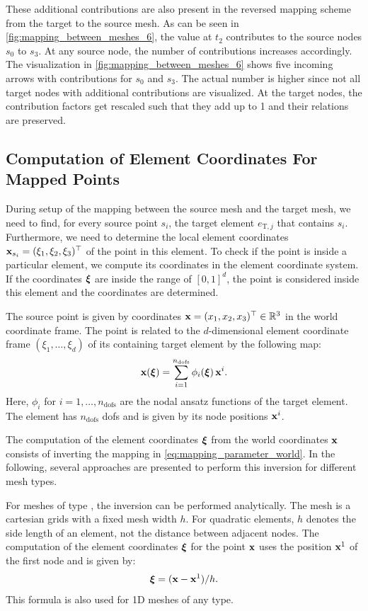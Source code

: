 These additional contributions are also present in the reversed mapping scheme from the target to the source mesh. As can be seen in \cref{fig:mapping_between_meshes_6}, the value at $t_2$ contributes to the source nodes $s_0$ to $s_3$. At any source node, the number of contributions increases accordingly. The visualization in \cref{fig:mapping_between_meshes_6} shows five incoming arrows with contributions for $s_0$ and $s_3$. The actual number is higher since not all target nodes with additional contributions are visualized. At the target nodes, the contribution factors get rescaled such that they add up to 1 and their relations are preserved.

\subsection{Computation of Element Coordinates For Mapped Points}

During setup of the mapping between the source mesh and the target mesh, we need to find, for every source point $s_i$, the target element $e_{\text{T},j}$ that contains $s_i$. Furthermore, we need to determine the local element coordinates $\textbf{x}_{s_i} = (\xi_1,\xi_2,\xi_3)^\top$ of the point in this element. To check if the point is inside a particular element, we compute its coordinates in the element coordinate system. If the coordinates $\boldsymbol{\xi}$ are inside the range of $[0,1]^d$, the point is considered inside this element and the coordinates are determined.

The source point is given by coordinates $\textbf{x}=(x_1,x_2,x_3)^\top \in \mathbb{R}^3$ in the world coordinate frame. The point is related to the $d$-dimensional element coordinate frame $(\xi_1,\dots,\xi_d)$ of its containing target element by the following map:
\begin{align}\label{eq:mapping_parameter_world}
  \textbf{x}(\boldsymbol{\xi}) = \displaystyle\sum\limits_{i=1}^{n_\text{dofs}} \phi_i(\boldsymbol{\xi})\, \textbf{x}^i.
\end{align}
Here, $\phi_i$ for $i=1,\dots,n_\text{dofs}$ are the nodal ansatz functions of the target element. The element  has $n_\text{dofs}$ dofs and is given by its node positions $\textbf{x}^i$.

The computation of the element coordinates $\boldsymbol{\xi}$ from the world coordinates $\textbf{x}$ consists of inverting the mapping in \cref{eq:mapping_parameter_world}. In the following, several approaches are presented to perform this inversion for different mesh types.

For meshes of type , the inversion can be performed analytically. The mesh is a cartesian grids with a fixed mesh width $h$. For quadratic elements, $h$ denotes the side length of an element, not the distance between adjacent nodes.
The computation of the element coordinates $\boldsymbol{\xi}$ for the point $\textbf{x}$ uses the position $\textbf{x}^1$ of the first node and is given by:
\begin{align*}
  \boldsymbol{\xi} = (\textbf{x} - \textbf{x}^1) / h.
\end{align*}
This formula is also used for 1D meshes of any type.

